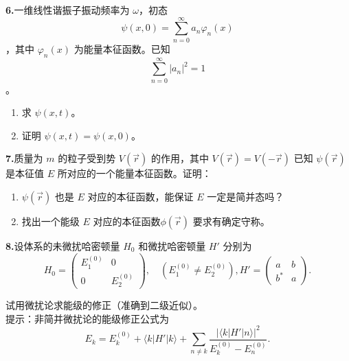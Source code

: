 \textbf{6.}一维线性谐振子振动频率为 $\omega$，初态 $$\psi(x, 0) = \sum_{n=0}^{\infty} a_n \varphi_n(x)~$$，其中 $\varphi_n(x)$ 为能量本征函数。已知 $$\sum_{n=0}^{\infty} |a_n|^2 = 1~$$。
\begin{enumerate}
    \item 求 $\psi(x, t)$。
    \item 证明 $\psi(x, t) = \psi(x, 0) $。
\end{enumerate}

\textbf{7.}质量为 $m$ 的粒子受到势 $V(\vec{r})$ 的作用，其中 $V(\vec{r}) = V(-\vec{r})$ 已知 $\psi(\vec{r})$ 是本征值 $E$ 所对应的一个能量本征函数。证明：
\begin{enumerate}
    \item  $\psi(\vec{r})$ 也是 $E$ 对应的本征函数，能保证 $E$ 一定是简并态吗？
    \item  找出一个能级 $E$ 对应的本征函数$\phi(\vec{r})$ 要求有确定守称。
\end{enumerate}

\textbf{8.}设体系的未微扰哈密顿量 $H_0$ 和微扰哈密顿量 $H'$ 分别为
$$H_0 = \begin{pmatrix}
E_1^{(0)} & 0 \\
0 & E_2^{(0)}
\end{pmatrix}, \quad (E_1^{(0)} \neq E_2^{(0)}),
H' = \begin{pmatrix}
a & b \\
b^* & a
\end{pmatrix}.~$$

试用微扰论求能级的修正（准确到二级近似）。\\
提示：非简并微扰论的能级修正公式为
$$E_k = E_k^{(0)} + \langle k | H' | k \rangle + \sum_{n \neq k} \frac{|\langle k | H' | n \rangle|^2}{E_k^{(0)} - E_n^{(0)}}.~$$

